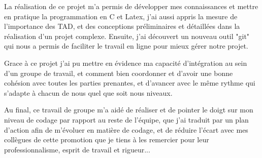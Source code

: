 %
  La réalisation de ce projet m'a permis de développer mes connaissances et mettre en pratique la programmation en C et Latex, j'ai aussi appris la mesure de l'importance des TAD, et des conceptions préliminaires et détaillées dans la réalisation d'un projet complexe. Ensuite, j'ai découvert un nouveau outil "git" qui nous a permis de faciliter le travail en ligne pour mieux gérer notre projet.
 
  Grace à ce projet j'ai pu mettre en évidence ma capacité d'intégration au sein d'un groupe de travail, et comment bien coordonner et d'avoir une bonne cohésion avec toutes les parties prenantes, et d'avancer avec le même rythme qui s'adapte à chacun de nous quel que soit nous niveaux.

  Au final, ce travail de groupe m'a aidé de réaliser et de pointer le doigt sur mon niveau de codage par rapport au reste de l'équipe, que j'ai traduit par un plan d'action afin de m'évoluer en matière de codage, et de réduire l'écart avec mes collègues de cette promotion que je tiens à les remercier pour leur professionnalisme, esprit de travail et rigueur...
  
